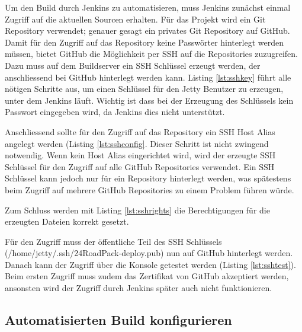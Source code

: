 Um den Build durch Jenkins zu automatisieren, muss Jenkins zunächst einmal Zugriff auf die aktuellen Sourcen erhalten. Für das Projekt wird ein Git Repository verwendet; genauer gesagt ein privates Git Repository auf GitHub. Damit für den Zugriff auf das Repository keine Passwörter hinterlegt werden müssen, bietet GitHub die Möglichkeit per SSH auf die Repositories zuzugreifen. Dazu muss auf dem Buildserver ein SSH Schlüssel erzeugt werden, der anschliessend bei GitHub hinterlegt werden kann. Listing \ref{lst:sshkey} führt alle nötigen Schritte aus, um einen Schlüssel für den Jetty Benutzer zu erzeugen, unter dem Jenkins läuft. Wichtig ist dass bei der Erzeugung des Schlüssels kein Passwort eingegeben wird, da Jenkins dies nicht unterstützt.



Anschliessend sollte für den Zugriff auf das Repository ein SSH Host Alias angelegt werden (Listing \ref{lst:sshconfig}. Dieser Schritt ist nicht zwingend notwendig. Wenn kein Host Alias eingerichtet wird, wird der erzeugte SSH Schlüssel für den Zugriff auf alle GitHub Repositories verwendet. Ein SSH Schlüssel kann jedoch nur für ein Repository hinterlegt werden, was spätestens beim Zugriff auf mehrere GitHub Repositories zu einem Problem führen würde.



Zum Schluss werden mit Listing \ref{lst:sshrights} die Berechtigungen für die erzeugten Dateien korrekt gesetzt.



Für den Zugriff muss der öffentliche Teil des SSH Schlüssels (/home/jetty/.ssh/24RoadPack-deploy.pub) nun auf GitHub hinterlegt werden. Danach kann der Zugriff über die Konsole getestet werden (Listing \ref{lst:sshtest}). Beim ersten Zugriff muss zudem das Zertifikat von GitHub akzeptiert werden, ansonsten wird der Zugriff durch Jenkins später auch nicht funktionieren.



\subsection{Automatisierten Build konfigurieren}

